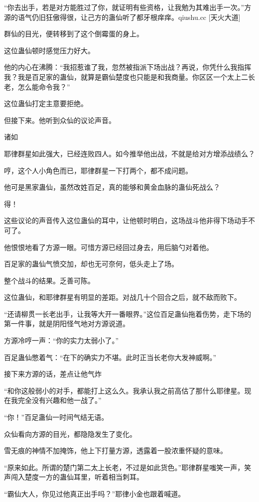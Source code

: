 \begin{this_body}
“你去出手，若是对方能胜过了你，就证明有些资格，让我勉为其难出手一次。”方源的语气仍旧狂傲得很，让己方的蛊仙听了都牙根痒痒。qiushu.cc [天火大道]

群仙的目光，便转移到了这个倒霉蛋的身上。

这位蛊仙顿时感觉压力好大。

他的内心在沸腾：“我招惹谁了我，忽然被指派下场出战？再说，你凭什么我指挥我？我是百足家的蛊仙，就算是霸仙楚度也只能是和我商量。你区区一个太上二长老，怎么能命令我？”

这位蛊仙打定主意要拒绝。

但接下来。他听到众仙的议论声音。

诸如

耶律群星如此强大，已经连败四人。如今推举他出战，不就是给对方增添战绩么？

哼，这个人小角色而已，耶律群星一下打两个，都不成问题。

他可是黑家蛊仙，虽然改姓百足，真的能够和黄金血脉的蛊仙死战么？

得！

这些议论的声音传入这位蛊仙的耳中，让他顿时明白，这场战斗他非得下场动手不可了。

他恨恨地看了方源一眼。可惜方源已经回过身去，用后脑勺对着他。

百足家的蛊仙气愤交加，却也无可奈何，低头走上了场。

整个战斗的结果。乏善可陈。

这位蛊仙，和耶律群星有明显的差距。对战几十个回合之后，就不敌而败下。

“还请柳贯一长老出手，让我等大开一番眼界。”这位百足蛊仙拖着伤势，走下场的第一件事，就是阴阳怪气地对方源说道。

方源冷哼一声：“你的实力太弱小了。”

百足蛊仙憋着气：“在下的确实力不堪。此时正当长老你大发神威啊。”

接下来方源的话，差点让他气炸

“和你这般弱小的对手，都能打上这么久。我承认我之前高估了那什么耶律星。现在我完全没有兴趣和他一战了。”

“你！”百足蛊仙一时间气结无语。

众仙看向方源的目光，都隐隐发生了变化。

雪无痕的神情不加掩饰，他上下打量方源，透露着一股浓重怀疑的意味。

“原来如此。所谓的楚门第二太上长老，不过是如此货色。”耶律群星嗤笑一声，笑声闯入楚度一方的蛊仙耳里，听着相当刺耳。

“霸仙大人，你见过他真正出手吗？”耶律小金也跟着喊道。


\end{this_body}

